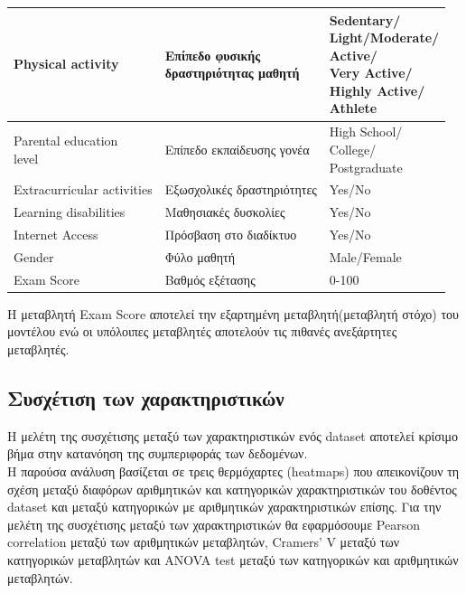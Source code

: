 \documentclass[12pt]{article}
\begin{document}
\begin{center}
\begin{longtable}{|p{5cm}|p{7.1cm}|p{4cm}|}
Physical activity & \makecell[l]{Επίπεδο φυσικής \\ δραστηριότητας μαθητή} & \makecell[l]{Sedentary/ \\ Light/Moderate/ \\ Active/ \\ Very Active/ \\ Highly Active/ \\ Athlete} \\ %
\hline

\makecell[l]{Parental education \\level} & Επίπεδο εκπαίδευσης γονέα & \makecell[l]{High School/ \\ College/ \\ Postgraduate} \\ %
\hline
Extracurricular activities & Εξωσχολικές δραστηριότητες & Yes/No \\ %
\hline
Learning disabilities & Μαθησιακές δυσκολίες & Yes/No \\ %
\hline

Internet Access & Πρόσβαση στο διαδίκτυο & Yes/No \\ %
\hline
Gender & Φύλο μαθητή & Male/Female \\ %
\hline

Exam Score & Βαθμός εξέτασης & 0-100 \\ %
\hline
\end{longtable}
\end{center}

\noindent Η μεταβλητή Exam Score αποτελεί την εξαρτημένη μεταβλητή(μεταβλητή στόχο) του μοντέλου ενώ οι υπόλοιπες μεταβλητές αποτελούν τις πιθανές ανεξάρτητες μεταβλητές. 

\subsection{Συσχέτιση των χαρακτηριστικών}

Η μελέτη της συσχέτισης μεταξύ των χαρακτηριστικών ενός dataset αποτελεί κρίσιμο βήμα στην κατανόηση της συμπεριφοράς των δεδομένων.\\

Η παρούσα ανάλυση βασίζεται σε τρεις θερμόχαρτες (heatmaps) που απεικονίζουν τη σχέση μεταξύ διαφόρων αριθμητικών και κατηγορικών χαρακτηριστικών του δοθέντος dataset και μεταξύ κατηγορικών με αριθμητικών χαρακτηριστικών επίσης. Για την μελέτη της συσχέτισης μεταξύ των χαρακτηριστικών θα εφαρμόσουμε Pearson correlation μεταξύ των αριθμητικών μεταβλητών, Cramers' V μεταξύ των κατηγορικών μεταβλητών και ANOVA test μεταξύ των κατηγορικών και αριθμητικών μεταβλητών. \\
\end{document}
